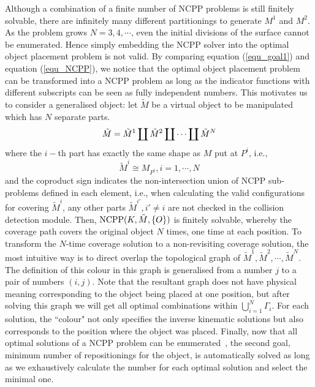 \documentclass[letterpaper, 10pt, conference]{ieeeconf}
\begin{document}
Although a combination of a finite number of NCPP problems is still finitely solvable, there are infinitely many different partitionings to generate $M^1$ and $M^2$. As the problem grows $N = 3, 4, \cdots$, even the initial divisions of the surface cannot be enumerated. 
Hence simply embedding the NCPP solver into the optimal object placement problem is not valid. 
By comparing equation (\ref{equ_goal1}) and equation (\ref{equ_NCPP}), we notice that the optimal object placement problem can be transformed into a NCPP problem as long as the indicator functions with different subscripts can be seen as fully independent numbers. 
This motivates us to consider a generalised object: let $\tilde{M}$ be a virtual object to be manipulated which has $N$ separate parts. 
\begin{equation}
\tilde{M} = \tilde{M}^1\coprod\tilde{M}^2\coprod\cdots\coprod \tilde{M}^N\\
\end{equation}
where the $i-$th part has exactly the same shape as $M$ put at $P^i$, i.e., 
\begin{equation}
\tilde{M}^i \cong M_{P^i}, i = 1, \cdots, N
\end{equation}
and the coproduct sign indicates the non-intersection union of NCPP sub-problems defined in each element, i.e., when calculating the valid configurations for covering $\tilde{M}^i$, any other parts $\tilde{M}^{i'}, i'\neq i$ are not checked in the collision detection module. 
Then, ${\rm NCPP}(K, \tilde{M}, \{O\})$ is finitely solvable, whereby the coverage path covers the original object $N$ times, one time at each position. 
To transform the $N$-time coverage solution to a non-revisiting coverage solution, the most intuitive way is to direct overlap the topological graph of $\tilde{M}^1, \tilde{M}^2, \cdots, \tilde{M}^N$. The definition of this colour in this graph is generalised from a number $j$ to a pair of numbers $(i, j)$. 
Note that the resultant graph does not have physical meaning corresponding to the object being placed at one position, but after solving this graph we will get all optimal combinations within $\bigcup\limits_{i = 1}^N \Gamma_i$. For each solution, the ``colour" not only specifies the inverse kinematic solutions but also corresponds to the position where the object was placed. Finally, now that all optimal solutions of a NCPP problem can be enumerated~\cite{Yang2020Nonrevisiting}, the second goal, minimum number of repositionings for the object, is automatically solved as long as we exhaustively calculate the number for each optimal solution and select the minimal one. 
\end{document}
